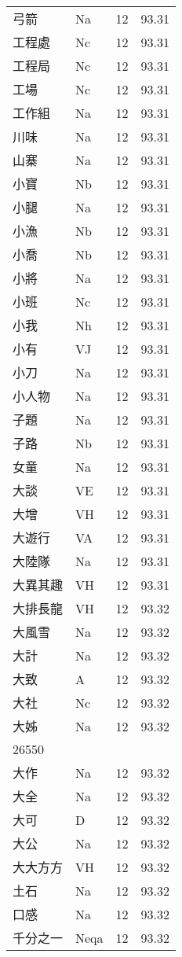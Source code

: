 \documentclass[twocolumn]{book}
\begin{document}
\begin{supertabular}{llrr}
弓箭 & Na & 12 &  93.31\\
工程處 & Nc & 12 &  93.31\\
工程局 & Nc & 12 &  93.31\\
工場 & Nc & 12 &  93.31\\
工作組 & Na & 12 &  93.31\\
川味 & Na & 12 &  93.31\\
山寨 & Na & 12 &  93.31\\
小寶 & Nb & 12 &  93.31\\
小腿 & Na & 12 &  93.31\\
小漁 & Nb & 12 &  93.31\\
小喬 & Nb & 12 &  93.31\\
小將 & Na & 12 &  93.31\\
小班 & Nc & 12 &  93.31\\
小我 & Nh & 12 &  93.31\\
小有 & VJ & 12 &  93.31\\
小刀 & Na & 12 &  93.31\\
小人物 & Na & 12 &  93.31\\
子題 & Na & 12 &  93.31\\
子路 & Nb & 12 &  93.31\\
女童 & Na & 12 &  93.31\\
大談 & VE & 12 &  93.31\\
大增 & VH & 12 &  93.31\\
大遊行 & VA & 12 &  93.31\\
大陸隊 & Na & 12 &  93.31\\
大異其趣 & VH & 12 &  93.31\\
大排長龍 & VH & 12 &  93.32\\
大風雪 & Na & 12 &  93.32\\
大計 & Na & 12 &  93.32\\
大致 & A & 12 &  93.32\\
大社 & Nc & 12 &  93.32\\
大姊 & Na & 12 &  93.32\\
26550\\
大作 & Na & 12 &  93.32\\
大全 & Na & 12 &  93.32\\
大可 & D & 12 &  93.32\\
大公 & Na & 12 &  93.32\\
大大方方 & VH & 12 &  93.32\\
土石 & Na & 12 &  93.32\\
口感 & Na & 12 &  93.32\\
千分之一 & Neqa & 12 &  93.32\\

\end{supertabular}
\end{document}
